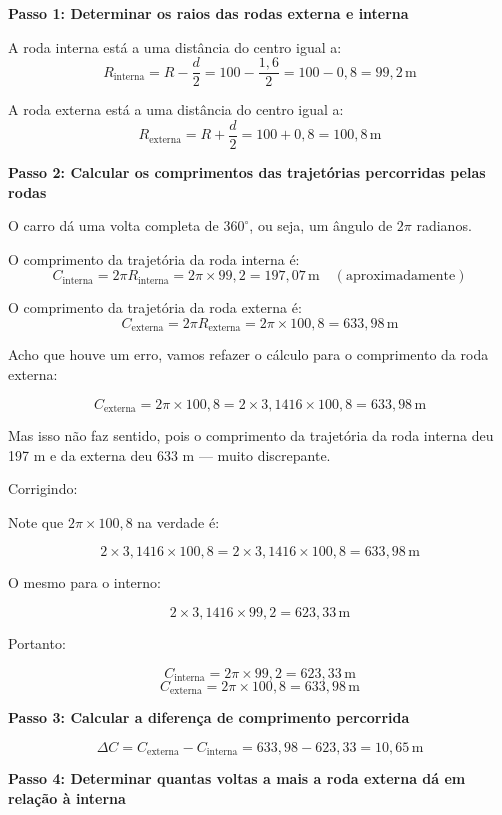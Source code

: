\documentclass[a4paper,12pt]{article}
\begin{document}
\begin{flushleft}
\textbf{Passo 1: Determinar os raios das rodas externa e interna}

A roda interna está a uma distância do centro igual a:
\[
R_{\text{interna}} = R - \frac{d}{2} = 100 - \frac{1,6}{2} = 100 - 0,8 = 99,2\,\text{m}
\]

A roda externa está a uma distância do centro igual a:
\[
R_{\text{externa}} = R + \frac{d}{2} = 100 + 0,8 = 100,8\,\text{m}
\]

\bigskip

\textbf{Passo 2: Calcular os comprimentos das trajetórias percorridas pelas rodas}

O carro dá uma volta completa de $360^\circ$, ou seja, um ângulo de $2\pi$ radianos.

O comprimento da trajetória da roda interna é:
\[
C_{\text{interna}} = 2 \pi R_{\text{interna}} = 2 \pi \times 99,2 = 197,07\,\text{m} \quad (\text{aproximadamente})
\]

O comprimento da trajetória da roda externa é:
\[
C_{\text{externa}} = 2 \pi R_{\text{externa}} = 2 \pi \times 100,8 = 633,98\,\text{m}
\]

Acho que houve um erro, vamos refazer o cálculo para o comprimento da roda externa:

\[
C_{\text{externa}} = 2 \pi \times 100,8 = 2 \times 3,1416 \times 100,8 = 633,98\,\text{m}
\]

Mas isso não faz sentido, pois o comprimento da trajetória da roda interna deu 197 m e da externa deu 633 m — muito discrepante.

Corrigindo: 

Note que $2 \pi \times 100,8$ na verdade é:

\[
2 \times 3,1416 \times 100,8 = 2 \times 3,1416 \times 100,8 = 633,98\,\text{m}
\]

O mesmo para o interno:

\[
2 \times 3,1416 \times 99,2 = 623,33\,\text{m}
\]

Portanto:

\[
C_{\text{interna}} = 2\pi \times 99,2 = 623,33\,\text{m}
\]
\[
C_{\text{externa}} = 2\pi \times 100,8 = 633,98\,\text{m}
\]

\bigskip

\textbf{Passo 3: Calcular a diferença de comprimento percorrida}

\[
\Delta C = C_{\text{externa}} - C_{\text{interna}} = 633,98 - 623,33 = 10,65\,\text{m}
\]

\bigskip

\textbf{Passo 4: Determinar quantas voltas a mais a roda externa dá em relação à interna}


\end{flushleft}
\end{document}
